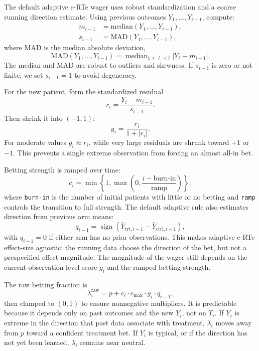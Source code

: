 \documentclass[10pt]{article}
\begin{document}
The default adaptive e-RTc wager uses robust standardization and a coarse running direction estimate. Using previous outcomes $Y_1, \dots, Y_{i-1}$, compute:
\begin{align}
m_{i-1} &= \text{median}(Y_1, \dots, Y_{i-1}), \\
s_{i-1} &= \text{MAD}(Y_1, \dots, Y_{i-1}) ,
\end{align}
where MAD is the median absolute deviation,
\begin{equation}
\mathrm{MAD}(Y_1,\ldots,Y_{i-1})
= \operatorname{median}_{1 \leq \ell < i}\left|Y_\ell - m_{i-1}\right|.
\end{equation}
The median and MAD are robust to outliers and skewness. If $s_{i-1}$ is zero or not finite, we set $s_{i-1} = 1$ to avoid degeneracy.

For the new patient, form the standardized residual
\begin{equation}
r_i = \frac{Y_i - m_{i-1}}{s_{i-1}}.
\end{equation}
Then shrink it into $(-1,1)$:
$$
g_i = \frac{r_i}{1 + |r_i|}.
$$
For moderate values $g_i \approx r_i$, while very large residuals are shrunk toward $+1$ or $-1$. This prevents a single extreme observation from forcing an almost all-in bet.

Betting strength is ramped over time:
\begin{equation}
c_i = \min\left\{1, \max\left(0, \frac{i - \text{burn-in}}{\text{ramp}}\right)\right\},
\end{equation}
where \texttt{burn-in} is the number of initial patients with little or no betting and \texttt{ramp} controls the transition to full strength. The default adaptive rule also estimates direction from previous arm means:
\begin{equation}
q_{i-1} = \operatorname{sign}\left(\bar{Y}_{\text{trt},i-1} - \bar{Y}_{\text{ctrl},i-1}\right),
\end{equation}
with $q_{i-1}=0$ if either arm has no prior observations. This makes adaptive e-RTc effect-size agnostic: the running data choose the direction of the bet, but not a prespecified effect magnitude. The magnitude of the wager still depends on the current observation-level score $g_i$ and the ramped betting strength.

The raw betting fraction is
\begin{equation}
\lambda_i^{\mathrm{raw}} = p + c_i \cdot c_{\max} \cdot g_i \cdot q_{i-1},
\end{equation}
then clamped to $(0,1)$ to ensure nonnegative multipliers. It is predictable because it depends only on past outcomes and the new $Y_i$, not on $T_i$. If $Y_i$ is extreme in the direction that past data associate with treatment, $\lambda_i$ moves away from $p$ toward a confident treatment bet. If $Y_i$ is typical, or if the direction has not yet been learned, $\lambda_i$ remains near neutral.
\end{document}
